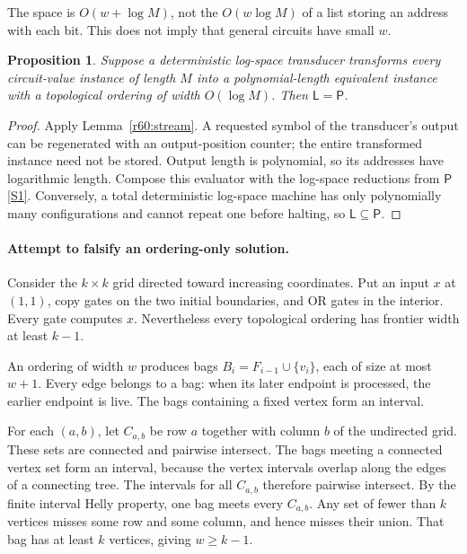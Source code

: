\documentclass[11pt,a4paper]{article}
\newcommand{\sref}[2]{\hyperlink{source:#1:#2}{[S#2]}}
\newtheorem{notebookproposition}[notebooklemma]{Proposition}
\numberwithin{equation}{section}
\begin{document}
The space is $O(w+\log M)$, not the $O(w\log M)$ of a list storing an address with each bit. This does not imply that general circuits have small $w$.

\begin{notebookproposition}\label{r60:conditional}
Suppose a deterministic log-space transducer transforms every circuit-value instance of length $M$ into a polynomial-length equivalent instance with a topological ordering of width $O(\log M)$. Then $\mathsf L=\mathsf P$.
\end{notebookproposition}
\begin{proof}
Apply Lemma~\ref{r60:stream}. A requested symbol of the transducer's output can be regenerated with an output-position counter; the entire transformed instance need not be stored. Output length is polynomial, so its addresses have logarithmic length. Compose this evaluator with the log-space reductions from $\mathsf P$ \sref{30006702}{1}. Conversely, a total deterministic log-space machine has only polynomially many configurations and cannot repeat one before halting, so $\mathsf L\subseteq\mathsf P$.
\end{proof}

\paragraph{Attempt to falsify an ordering-only solution.}
Consider the $k\times k$ grid directed toward increasing coordinates. Put an input $x$ at $(1,1)$, copy gates on the two initial boundaries, and OR gates in the interior. Every gate computes $x$. Nevertheless every topological ordering has frontier width at least $k-1$.

An ordering of width $w$ produces bags $B_i=F_{i-1}\cup\{v_i\}$, each of size at most $w+1$. Every edge belongs to a bag: when its later endpoint is processed, the earlier endpoint is live. The bags containing a fixed vertex form an interval.

For each $(a,b)$, let $C_{a,b}$ be row $a$ together with column $b$ of the undirected grid. These sets are connected and pairwise intersect. The bags meeting a connected vertex set form an interval, because the vertex intervals overlap along the edges of a connecting tree. The intervals for all $C_{a,b}$ therefore pairwise intersect. By the finite interval Helly property, one bag meets every $C_{a,b}$. Any set of fewer than $k$ vertices misses some row and some column, and hence misses their union. That bag has at least $k$ vertices, giving $w\ge k-1$.
\end{document}
